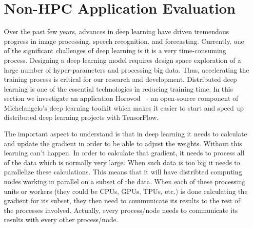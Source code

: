 \documentclass[sigconf]{acmart}
\begin{document}
\section{Non-HPC Application Evaluation}\label{sec:application}
Over the past few years, advances in deep learning have driven tremendous progress in image
processing, speech recognition, and forecasting. Currently, one of the significant challenges
of deep learning is it is a very time-consuming process. Designing a deep learning model
requires design space exploration of a large number of hyper-parameters and processing big data.
Thus, accelerating the training process is critical for our research and development.
Distributed deep learning is one of the essential technologies in reducing training time.
In this section we investigate an application Horovod~\cite{sergeev2018horovod} - an open-source component of Michelangelo's deep learning toolkit which makes it easier to start and speed
up distributed deep learning projects with TensorFlow.

The important aspect to understand is that in deep learning it needs to calculate and update the gradient
in order to be able to adjust the weights. Without this learning can't happen. In order to calculate that gradient, it needs to process all of the data which is normally very large. When such data is too big it needs to parallelize these calculations. This means that it will have distribted computing nodes working in parallel on a subset of the data. When each of these processing units or workers (they could be CPUs, GPUs, TPUs, etc.) is done calculating the gradient for its subset, they then need to communicate its results to the rest of the processes involved. Actually, every process/node needs to communicate its results with every other process/node.
\end{document}
